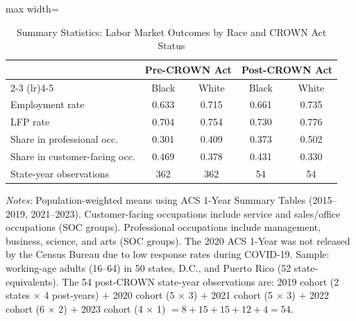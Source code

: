 \begin{table}[htbp]
\centering
\caption{Summary Statistics: Labor Market Outcomes by Race and CROWN Act Status}
\label{tab:sumstats}
\begin{adjustbox}{max width=\textwidth}
\begin{tabular}{lcccc}
\toprule
 & \multicolumn{2}{c}{Pre-CROWN Act} & \multicolumn{2}{c}{Post-CROWN Act} \\
\cmidrule(lr){2-3} \cmidrule(lr){4-5}
 & Black & White & Black & White \\
\midrule
Employment rate & 0.633 & 0.715 & 0.661 & 0.735 \\
LFP rate & 0.704 & 0.754 & 0.730 & 0.776 \\
Share in professional occ. & 0.301 & 0.409 & 0.373 & 0.502 \\
Share in customer-facing occ. & 0.469 & 0.378 & 0.431 & 0.330 \\
\midrule
State-year observations & 362 & 362 & 54 & 54 \\
\bottomrule
\end{tabular}
\end{adjustbox}
\begin{tablenotes}[flushleft]
\small
\item \textit{Notes:} Population-weighted means using ACS 1-Year Summary Tables (2015--2019, 2021--2023). Customer-facing occupations include service and sales/office occupations (SOC groups). Professional occupations include management, business, science, and arts (SOC groups). The 2020 ACS 1-Year was not released by the Census Bureau due to low response rates during COVID-19. Sample: working-age adults (16--64) in 50 states, D.C., and Puerto Rico (52 state-equivalents). The 54 post-CROWN state-year observations are: 2019 cohort (2 states $\times$ 4 post-years) $+$ 2020 cohort (5 $\times$ 3) $+$ 2021 cohort (5 $\times$ 3) $+$ 2022 cohort (6 $\times$ 2) $+$ 2023 cohort (4 $\times$ 1) $= 8 + 15 + 15 + 12 + 4 = 54$.
\end{tablenotes}
\end{table}
